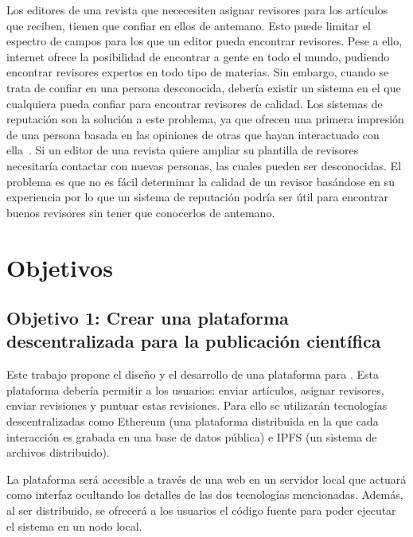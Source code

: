 Los editores de una revista que nececesiten asignar revisores para los
artículos que reciben, tienen que confiar en ellos de antemano. Esto puede
limitar el espectro de campos para los que un editor pueda encontrar revisores.
Pese a ello, internet ofrece la posibilidad de encontrar a gente en
todo el mundo, pudiendo encontrar revisores expertos en todo tipo de materias.
Sin embargo, cuando se trata de confiar en una persona desconocida, debería
existir un sistema en el que cualquiera pueda confiar para encontrar revisores
de calidad. Los sistemas de reputación son la solución a este problema, ya
que ofrecen una primera impresión de una persona basada en las opiniones de
otras que hayan interactuado con ella~\cite{resnick2000reputation}. Si un editor
de una revista quiere ampliar su plantilla de revisores necesitaría contactar
con nuevas personas, las cuales pueden ser desconocidas. El problema es que no
es fácil determinar la calidad de un revisor basándose en su experiencia
\cite{callaham_relationship_2007} por lo que un sistema de reputación podría ser
útil para encontrar buenos revisores sin tener que conocerlos de antemano.

\section{Objetivos}
\label{sec:objectives-1}
\subsection*{Objetivo 1: Crear una plataforma descentralizada para la publicación
  científica}

Este trabajo propone el diseño y el desarrollo de una plataforma para . Esta plataforma debería permitir a los usuarios: enviar artículos,
asignar revisores, enviar revisiones y puntuar estas revisiones. Para ello se
utilizarán tecnologías descentralizadas como Ethereum (una plataforma
distribuida en la que cada interacción es grabada en una base de datos pública)
e IPFS (un sistema de archivos distribuido).

La plataforma será accesible a través de una web en un servidor local
que actuará como interfaz ocultando los detalles de las dos tecnologías mencionadas. Además, al ser
distribuido, se ofrecerá a los usuarios el código fuente para poder ejecutar el sistema en un nodo local.

